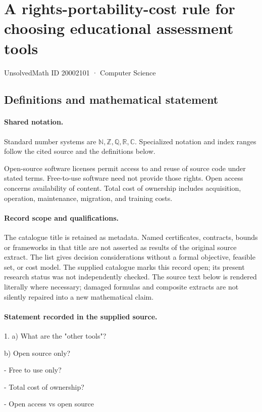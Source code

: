 \documentclass[11pt]{article}
\begin{document}
\setcounter{section}{20002100}
\section{A rights-portability-cost rule for choosing educational assessment tools}\label{20002101}
{\small\sffamily UnsolvedMath ID 20002101 · Computer Science}
\subsection{Definitions and mathematical statement}

\paragraph{Shared notation.}Standard number systems are $\mathbb N,\mathbb Z,\mathbb Q,\mathbb R,\mathbb C$. Specialized notation and index ranges follow the cited source and the definitions below.


Open-source software licenses permit access to and reuse of source code under stated terms. Free-to-use software need not provide those rights. Open access concerns availability of content. Total cost of ownership includes acquisition, operation, maintenance, migration, and training costs.
\paragraph{Record scope and qualifications.}
The catalogue title is retained as metadata. Named certificates, contracts, bounds or frameworks in that title are not asserted as results of the original source extract.
The list gives decision considerations without a formal objective, feasible set, or cost model. The supplied catalogue marks this record open; its present research status was not independently checked.
The source text below is rendered literally where necessary; damaged formulas and composite extracts are not silently repaired into a new mathematical claim.
\paragraph{Statement recorded in the supplied source.}
1. a) What are the "other tools"?

b) Open source only?

- Free to use only?

- Total cost of ownership?

- Open access vs open source
\end{document}
